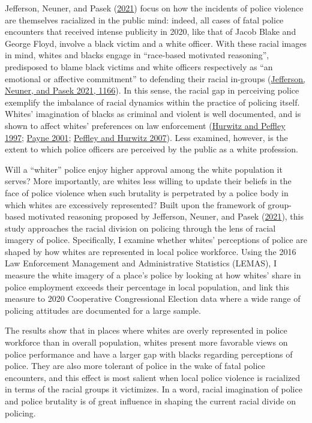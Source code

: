 \documentclass[
  12pt,
]{article}
\begin{document}
Jefferson, Neuner, and Pasek
(\protect\hyperlink{ref-jefferson2021}{2021}) focus on how the incidents
of police violence are themselves racialized in the public mind: indeed,
all cases of fatal police encounters that received intense publicity in
2020, like that of Jacob Blake and George Floyd, involve a black victim
and a white officer. With these racial images in mind, whites and blacks
engage in ``race-based motivated reasoning'', predisposed to blame black
victims and white officers respectively as ``an emotional or affective
commitment'' to defending their racial in-groups
(\protect\hyperlink{ref-jefferson2021}{Jefferson, Neuner, and Pasek
2021, 1166}). In this sense, the racial gap in perceiving police
exemplify the imbalance of racial dynamics within the practice of
policing itself. Whites' imagination of blacks as criminal and violent
is well documented, and is shown to affect whites' preferences on law
enforcement (\protect\hyperlink{ref-hurwitz1997}{Hurwitz and Peffley
1997}; \protect\hyperlink{ref-payne2001}{Payne 2001};
\protect\hyperlink{ref-peffley2007}{Peffley and Hurwitz 2007}). Less
examined, however, is the extent to which police officers are perceived
by the public as a white profession.

Will a ``whiter'' police enjoy higher approval among the white
population it serves? More importantly, are whites less willing to
update their beliefs in the face of police violence when such brutality
is perpetrated by a police body in which whites are excessively
represented? Built upon the framework of group-based motivated reasoning
proposed by Jefferson, Neuner, and Pasek
(\protect\hyperlink{ref-jefferson2021}{2021}), this study approaches the
racial division on policing through the lens of racial imagery of
police. Specifically, I examine whether whites' perceptions of police
are shaped by how whites are represented in local police workforce.
Using the 2016 Law Enforcement Management and Administrative Statistics
(LEMAS), I measure the white imagery of a place's police by looking at
how whites' share in police employment exceeds their percentage in local
population, and link this measure to 2020 Cooperative Congressional
Election data where a wide range of policing attitudes are documented
for a large sample.

The results show that in places where whites are overly represented in
police workforce than in overall population, whites present more
favorable views on police performance and have a larger gap with blacks
regarding perceptions of police. They are also more tolerant of police
in the wake of fatal police encounters, and this effect is most salient
when local police violence is racialized in terms of the racial groups
it victimizes. In a word, racial imagination of police and police
brutality is of great influence in shaping the current racial divide on
policing.
\end{document}
